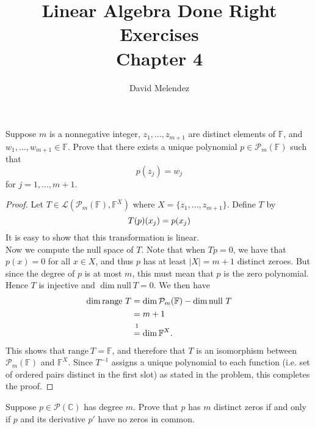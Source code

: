 \documentclass[12pt]{article}
\newenvironment{problem}[2][Problem]{\begin{trivlist}
\item[\hskip \labelsep {\bfseries #1}\hskip \labelsep {\bfseries #2.}]}{\end{trivlist}}
\newcommand{\nul}{\text{null}\ }
\newcommand{\range}{\text{range}\ }
\begin{document}
\title{Linear Algebra Done Right Exercises\\ \large Chapter 4}
\author{David Melendez}
\maketitle

\begin{problem}{5}
  Suppose $m$ is a nonnegative integer, $z_1,\dots,z_{m+1}$ are distinct elements of $\mathbb{F}$, and
  $w_1,\dots,w_{m+1} \in \mathbb{F}$. Prove that there exists a unique polynomial 
  $p\in \mathcal{P}_m(\mathbb{F})$ such that
  \begin{equation*}
    p(z_j) = w_j
  \end{equation*}
  for $j = 1,\dots,m+1$.
\end{problem}
\begin{proof}
  Let $T \in \mathcal{L}(\mathcal{P}_m(\mathbb{F}), \mathbb{F}^X)$ where $X = \{z_1,\dots,z_{m+1}\}$. 
  Define $T$ by
  \begin{equation*}
    T(p)(x_j) = p(x_j)\\
  \end{equation*}
  It is easy to show that this transformation is linear.\\
  Now we compute the null space of $T$.
  Note that when $Tp=0$, we have that $p(x)=0$ for all $x\in X$, 
  and thus $p$ has at least $|X| = m+1$ distinct zeroes. 
  But since the degree of $p$ is at most $m$, this must mean that $p$ is the zero polynomial.
  Hence $T$ is injective and $\dim\nul T = 0$. 
  We then have
  \begin{align*}
    \dim\range T &= \dim \mathcal{P}_m(\mathbb{F}) - \dim\nul T\\
    &= m + 1 \\
    &\stackrel{\footnotemark}{=} \dim \mathbb{F}^X\text{.}
  \end{align*}
  This shows that $\range T = \mathbb{F}$, and therefore that $T$ is an isomorphism between
  $\mathcal{P}_m(\mathbb{F})$ and $\mathbb{F}^X$. 
  Since $T^{-1}$ assigns a unique polynomial to each function 
  (i.e. set of ordered pairs distinct in the first slot) 
  as stated in the problem, this completes the proof.
\end{proof}
\begin{problem}{6}
  Suppose $p\in\mathcal{P}(\mathbb{C})$ has degree $m$. 
  Prove that $p$ has $m$ distinct zeros if and only if $p$ and its derivative $p'$ have no zeros in common.
\end{problem}
\end{document}
